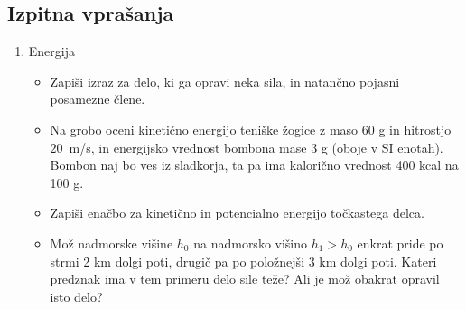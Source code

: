 \newpage
\subsection*{Izpitna vprašanja}
\begin{enumerate}
    \item Energija
    \begin{itemize}
        \item Zapiši izraz za delo, ki ga opravi neka sila, in natančno pojasni posamezne člene.
        \item Na grobo oceni kinetično energijo teniške žogice z maso \(60\) g in hitrostjo \(20\)~m/s, in energijsko vrednost bombona mase 3 g (oboje v SI enotah). Bombon naj bo ves iz sladkorja, ta pa ima kalorično vrednost 400 kcal na 100 g.
        \item Zapiši enačbo za kinetično in potencialno energijo točkastega delca.
        \item Mož nadmorske višine \(h_0\) na nadmorsko višino \(h_1 > h_0\) enkrat pride po strmi 2 km dolgi poti, drugič pa po položnejši 3 km dolgi poti. Kateri predznak ima v tem primeru delo sile teže? Ali je mož obakrat opravil isto delo?
    \end{itemize}
\end{enumerate}